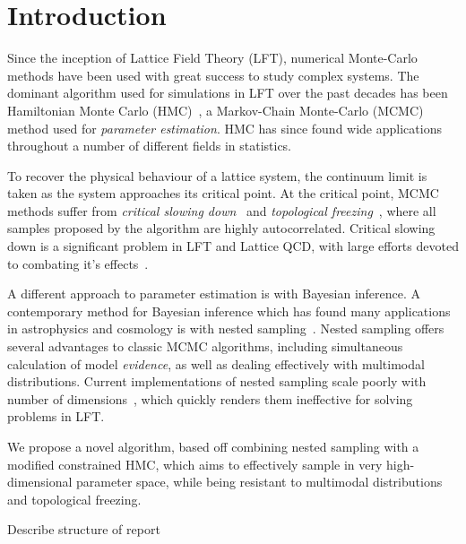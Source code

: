 \documentclass[11pt]{article}
\begin{document}
    \section{Introduction}\label{Introduction}
    Since the inception of Lattice Field Theory (LFT), numerical Monte-Carlo methods have been used with great success to
    study complex systems.
    The dominant algorithm used for simulations in LFT over the past decades has been Hamiltonian Monte Carlo
    (HMC)~\cite{HMC_Duane}, a Markov-Chain Monte-Carlo (MCMC) method used for \emph{parameter estimation}. HMC has
    since found wide applications throughout a number of different fields in statistics.

    To recover the physical behaviour of a lattice system, the continuum limit is taken as the system approaches its
    critical point.
    At the critical point, MCMC methods suffer from \emph{critical slowing down}~\cite{CriticalSlowingWOLFF} and
    \emph{topological freezing}~\cite{Hasenbusch_2018}, where all samples proposed by the algorithm are highly
    autocorrelated.
    Critical slowing down is a significant problem in LFT and Lattice QCD, with large efforts devoted to combating
    it's effects~\cite{Pawlowski_2020,Jansen_MLMC_2020,Albergo_Flow_LFT_2019}.

    A different approach to parameter estimation is with Bayesian inference.
    A contemporary method for Bayesian inference which has found many applications in astrophysics and cosmology
    is with nested sampling~\cite{Skilling2006,Handley_polychord}.
    Nested sampling offers several advantages to classic MCMC algorithms, including simultaneous calculation of model
    \emph{evidence}, as well as dealing effectively with multimodal distributions.
    Current implementations of nested sampling scale poorly with number of dimensions~\cite{Feroz_2009}, which quickly
    renders them ineffective for solving problems in LFT.

    We propose a novel algorithm, based off combining nested sampling with a modified constrained HMC, which aims
    to effectively sample in very high-dimensional parameter space, while being resistant to multimodal distributions
    and topological freezing.

    Describe structure of report
\end{document}
